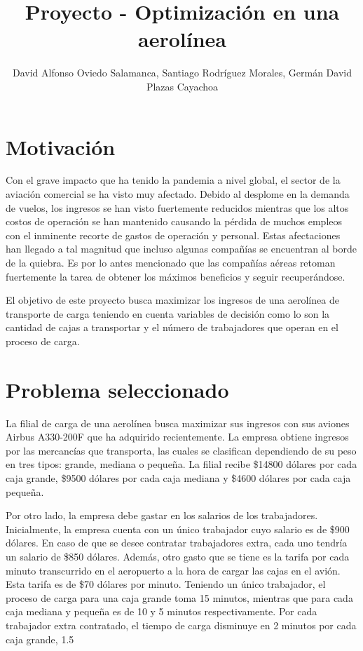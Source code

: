 \documentclass[11pt]{article}
\begin{document}
\title{\textcolor{blueMacc}{Proyecto - Optimización en una aerolínea}}
\author{David Alfonso Oviedo Salamanca, Santiago Rodríguez Morales, Germán David Plazas Cayachoa
}


\maketitle
\thispagestyle{fancy}
\section{Motivación}
\justify
Con el grave impacto que ha tenido la pandemia a nivel global, el sector de la aviación comercial se ha visto muy afectado. Debido al desplome en la demanda de vuelos, los ingresos se han visto fuertemente reducidos mientras que los altos costos de operación se han mantenido causando la pérdida de muchos empleos con el inminente recorte de gastos de operación y personal. Estas afectaciones han llegado a tal magnitud que incluso algunas compañías se encuentran al borde de la quiebra. Es por lo antes mencionado que las compañías aéreas retoman fuertemente la tarea de obtener los máximos beneficios y seguir recuperándose.

El objetivo de este proyecto busca maximizar los ingresos de una aerolínea de transporte de carga teniendo en cuenta variables de decisión como lo son la cantidad de cajas a transportar y el número de trabajadores que operan en el proceso de carga.
\justify

\section{Problema seleccionado}

La filial de carga de una aerolínea busca maximizar sus ingresos con sus aviones Airbus A330-200F que ha adquirido recientemente. La empresa obtiene ingresos por las mercancías que transporta, las cuales se clasifican dependiendo de su peso en tres tipos: grande, mediana o pequeña. La filial recibe \$14800 dólares por cada caja grande, \$9500 dólares por cada caja mediana y \$4600 dólares por cada caja pequeña. 

Por otro lado, la empresa debe gastar en los salarios de los trabajadores. Inicialmente, la empresa cuenta con un único trabajador cuyo salario es de \$900 dólares. En caso de que se desee contratar trabajadores extra, cada uno tendría un salario de \$850 dólares. Además, otro gasto que se tiene es la tarifa por cada minuto transcurrido en el aeropuerto a la hora de cargar las cajas en el avión. Esta tarifa es de \$70 dólares por minuto. Teniendo un único trabajador, el proceso de carga para una caja grande toma 15 minutos, mientras que para cada caja mediana y pequeña es de 10 y 5 minutos respectivamente. Por cada trabajador extra contratado, el tiempo de carga disminuye en 2 minutos por cada caja grande, 1.5 
\end{document}
